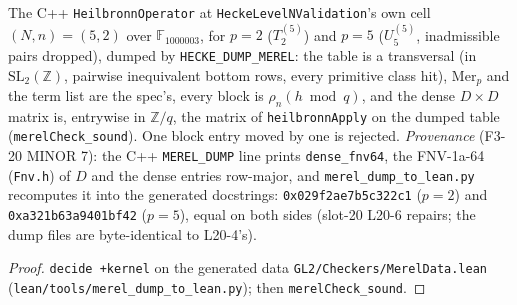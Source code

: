 \begin{theorem}\label{chk:merel-n5}
  \leanok
  The C++ \texttt{HeilbronnOperator} at \texttt{HeckeLevelNValidation}'s own cell $(N,n)=(5,2)$ over $\mathbb F_{1000003}$, for $p=2$
  ($T_2^{(5)}$) and $p=5$ ($U_5^{(5)}$, inadmissible pairs dropped), dumped by \texttt{HECKE\_DUMP\_MEREL}: the table is a transversal
  (in $\mathrm{SL}_2(\mathbb Z)$, pairwise inequivalent bottom rows, every primitive class hit), $\mathrm{Mer}_p$ and the term list are
  the spec's, every block is $\rho_n(h\bmod q)$, and the dense $D\times D$ matrix is, entrywise in $\mathbb Z/q$, the matrix of
  \texttt{heilbronnApply} on the dumped table (\texttt{merelCheck\_sound}). One block entry moved by one is rejected.
  \emph{Provenance} (F3-20 MINOR 7): the C++ \texttt{MEREL\_DUMP} line prints \texttt{dense\_fnv64}, the FNV-1a-64
  (\texttt{Fnv.h}) of $D$ and the dense entries row-major, and \texttt{merel\_dump\_to\_lean.py} recomputes it into the generated
  docstrings: \texttt{0x029f2ae7b5c322c1} ($p=2$) and \texttt{0xa321b63a9401bf42} ($p=5$), equal on both sides (slot-20 L20-6
  repairs; the dump files are byte-identical to L20-4's).
\end{theorem}
\begin{proof}
  \leanok
  \texttt{decide +kernel} on the generated data \texttt{GL2/Checkers/MerelData.lean} (\texttt{lean/tools/merel\_dump\_to\_lean.py}); then
  \texttt{merelCheck\_sound}.
\end{proof}

